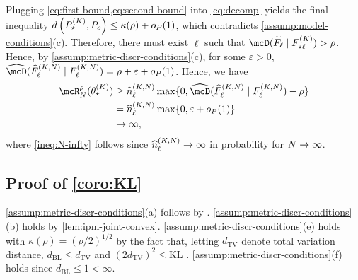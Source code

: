 Plugging \cref{eq:first-bound,eq:second-bound} into \cref{eq:decomp} yields the final inequality $d\left(P^{(K)}_{\star}, P_{o}\right) \le \kappa(\rho) + o_{P}(1)$, which contradicts \cref{assump:model-conditions}(c).
Therefore, there must exist $\ell$ such that $\discr{\widetilde{F}_{\ell}}{F^{(\numcomps)}_{\star \ell}} > \rho$.
Hence, by \cref{assump:metric-discr-conditions}(c), for some $\varepsilon > 0$, $\discrest{\widehat{F}_{\ell}^{(\numcomps,\numobs)} }{F^{(\numcomps,\numobs)}_{\ell}} = \rho + \varepsilon +\op(1)$.
Hence, we have
\begin{align}
	\mcR^{\rho}_{\numobs}(\allparam^{(\numcomps)}_{\star})
	 & \ge \widehat{n}_{\ell}^{(\numcomps,\numobs)}\max\{0, \discrest{\widehat{F}_{\ell}^{(\numcomps,\numobs)} }{F^{(\numcomps,\numobs)}_{\ell}} - \rho\}                             \\
	 & = \widehat{n}_{\ell}^{(\numcomps,\numobs)}\max\{0, \varepsilon + \op(1)\}                                                                                                               \\
	 & \rightarrow \infty,\label{ineq:N-infty}
\end{align}
where \cref{ineq:N-infty} follows
since $\widehat{n}_{\ell}^{(K,N)}  \rightarrow \infty$ in probability for $N\rightarrow\infty$.


\subsection{Proof of \cref{coro:KL}}

 \cref{assump:metric-discr-conditions}(a) follows by \citet[Theorem 1]{Wellner:1981}.
 \cref{assump:metric-discr-conditions}(b) holds by \cref{lem:ipm-joint-convex}.
 \cref{assump:metric-discr-conditions}(e) holds with $\kappa(\rho) =(\rho/2)^{1/2}$ by the fact that, letting $d_{\mathrm{TV}}$
denote total variation distance, $d_{\mathrm{BL}} \le d_{\mathrm{TV}}$ and
$(2d_{\mathrm{TV}})^{2}  \le \mathrm{KL}$ \citep[][Section 3]{Gibbs:2002}.
 \cref{assump:metric-discr-conditions}(f) holds since $d_{\mathrm{BL}} \le 1 < \infty$.

